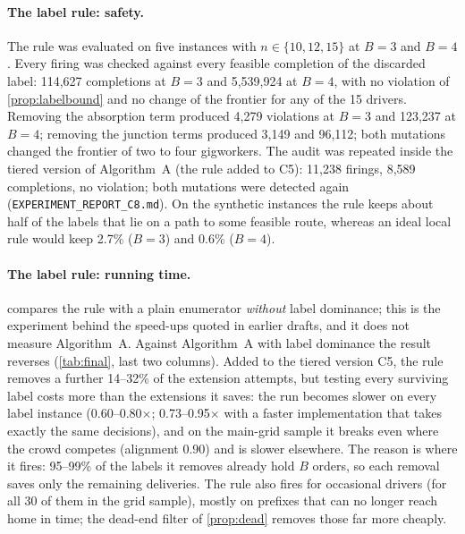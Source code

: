 \documentclass[11pt]{article}
\theoremstyle{definition}
\theoremstyle{remark}
\begin{document}
\paragraph{The label rule: safety.} The rule was evaluated on five instances
with $n\in\{10,12,15\}$ at $B=3$ and $B=4$. Every firing was checked against
every feasible completion of the discarded label: 114,627 completions at $B=3$
and 5,539,924 at $B=4$, with no violation of \cref{prop:labelbound} and no
change of the frontier for any of the 15 drivers. Removing the absorption term
produced 4,279 violations at $B=3$ and 123,237 at $B=4$; removing the junction
terms produced 3,149 and 96,112; both mutations changed the frontier of two to
four gigworkers. The audit was repeated inside the tiered version of
Algorithm~A (the rule added to C5): 11,238 firings, 8,589 completions, no
violation; both mutations were detected again
(\texttt{EXPERIMENT\_REPORT\_C8.md}). On the synthetic instances the rule keeps
about half of the labels that lie on a path to some feasible route, whereas an
ideal local rule would keep 2.7\% ($B=3$) and 0.6\% ($B=4$).

\paragraph{The label rule: running time.}  compares the rule
with a plain enumerator \emph{without} label dominance; this is the experiment
behind the speed-ups quoted in earlier drafts, and it does not measure
Algorithm~A. Against Algorithm~A with label dominance the result reverses
(\cref{tab:final}, last two columns). Added to the tiered version C5, the rule
removes a further 14--32\% of the extension attempts, but testing every
surviving label costs more than the extensions it saves: the run becomes
slower on every label instance (0.60--0.80$\times$; 0.73--0.95$\times$ with a
faster implementation that takes exactly the same decisions), and on the
main-grid sample it breaks even where the crowd competes (alignment 0.90) and
is slower elsewhere. The reason is where it fires: 95--99\% of the labels it
removes already hold $B$ orders, so each removal saves only the remaining
deliveries. The rule also fires for occasional drivers (for all 30 of them in
the grid sample), mostly on prefixes that can no longer reach home in time;
the dead-end filter of \cref{prop:dead} removes those far more cheaply.
\end{document}
